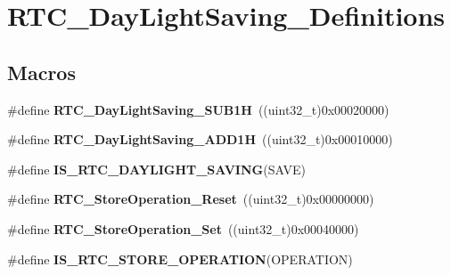\hypertarget{group___r_t_c___day_light_saving___definitions}{\section{R\-T\-C\-\_\-\-Day\-Light\-Saving\-\_\-\-Definitions}
\label{group___r_t_c___day_light_saving___definitions}
}
\subsection*{Macros}
\begin{DoxyCompactItemize}
\item 
\hypertarget{group___r_t_c___day_light_saving___definitions_gaa037e9c81c2ebae4c30dbe000bc01532}{\#define {\bfseries R\-T\-C\-\_\-\-Day\-Light\-Saving\-\_\-\-S\-U\-B1\-H}~((uint32\-\_\-t)0x00020000)}\label{group___r_t_c___day_light_saving___definitions_gaa037e9c81c2ebae4c30dbe000bc01532}

\item 
\hypertarget{group___r_t_c___day_light_saving___definitions_ga72c25e9ad533dfc00185ebdc359d0c5a}{\#define {\bfseries R\-T\-C\-\_\-\-Day\-Light\-Saving\-\_\-\-A\-D\-D1\-H}~((uint32\-\_\-t)0x00010000)}\label{group___r_t_c___day_light_saving___definitions_ga72c25e9ad533dfc00185ebdc359d0c5a}

\item 
\#define {\bfseries I\-S\-\_\-\-R\-T\-C\-\_\-\-D\-A\-Y\-L\-I\-G\-H\-T\-\_\-\-S\-A\-V\-I\-N\-G}(S\-A\-V\-E)
\item 
\hypertarget{group___r_t_c___day_light_saving___definitions_ga8355e1ca7bd8ccc5130d29605fe3a2cc}{\#define {\bfseries R\-T\-C\-\_\-\-Store\-Operation\-\_\-\-Reset}~((uint32\-\_\-t)0x00000000)}\label{group___r_t_c___day_light_saving___definitions_ga8355e1ca7bd8ccc5130d29605fe3a2cc}

\item 
\hypertarget{group___r_t_c___day_light_saving___definitions_ga4c8817bed02ba11bbe542180b572b0b2}{\#define {\bfseries R\-T\-C\-\_\-\-Store\-Operation\-\_\-\-Set}~((uint32\-\_\-t)0x00040000)}\label{group___r_t_c___day_light_saving___definitions_ga4c8817bed02ba11bbe542180b572b0b2}

\item 
\#define {\bfseries I\-S\-\_\-\-R\-T\-C\-\_\-\-S\-T\-O\-R\-E\-\_\-\-O\-P\-E\-R\-A\-T\-I\-O\-N}(O\-P\-E\-R\-A\-T\-I\-O\-N)
\end{DoxyCompactItemize}


